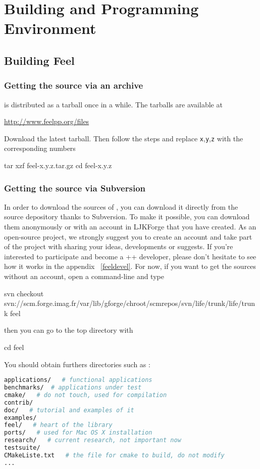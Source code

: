 \chapter{Building and Programming Environment}


\section{Building Feel}
\subsection{Getting the source via an archive}
\label{sec:getting-source-via-1}

\feel is distributed as a tarball once in a while. The tarballs are available
at
\begin{center}
  \href{http://www.feelpp.org/files}{http://www.feelpp.org/files}
\end{center}
Download the latest tarball. Then follow the steps and replace
\texttt{x},\texttt{y},\texttt{z} with the corresponding numbers

\begin{unixcom}
  tar xzf feel-x.y.z.tar.gz
  cd feel-x.y.z
\end{unixcom}


\subsection{Getting the source via Subversion}
\label{sec:getting-source-via}
In order to download the sources of \feel, you can download it directly from the source depository thanks to Subversion. To make it possible, you can download them anonymously or with an account in LJKForge that you have created. As an open-source project, we strongly suggest you to create an account and take part of the project with sharing your ideas, developments or suggests. If you're interested to participate and become a \feel++ developer, please don't hesitate to see how it works in the appendix ~\ref{feeldevel}. For now, if you want to get the sources without an account, open a command-line and type
\begin{unixcom}
		svn checkout svn://scm.forge.imag.fr/var/lib/gforge/chroot/scmrepos/svn/life/trunk/life/trunk feel
\end{unixcom}
then you can go to the \feel top directory with
\begin{unixcom}
		cd feel
\end{unixcom} 
You should obtain furthers directories such as :
\begin{lstlisting}[language=sh]
applications/   # functional applications
benchmarks/  # applications under test
cmake/   # do not touch, used for compilation
contrib/
doc/   # tutorial and examples of it
examples/
feel/   # heart of the library
ports/   # used for Mac OS X installation
research/   # current research, not important now 
testsuite/   
CMakeListe.txt   # the file for cmake to build, do not modify
...
\end{lstlisting} 

